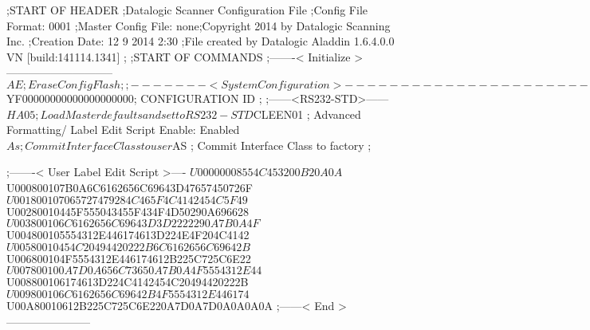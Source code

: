 ;START OF HEADER
;Datalogic Scanner Configuration File
;Config File Format: 0001
;Master Config File: none;Copyright 2014 by Datalogic Scanning Inc.
;Creation Date: 12 9 2014 2:30
;File created by Datalogic Aladdin 1.6.4.0.0 VN [build:141114.1341]
;
;START OF COMMANDS
;-------< Initialize >-----------------------------
$AE                 ; Erase Config Flash
;
;-------< System Configuration >-------------------------------
$YF00000000000000000000; CONFIGURATION ID
;
;------<RS232-STD>------
$HA05              ; Load Master defaults and set to RS232-STD
$CLEEN01            ; Advanced Formatting/ Label Edit Script Enable: Enabled
$As                 ; Commit Interface Class to user
$AS                 ; Commit Interface Class to factory
;

;-------< User Label Edit Script >----
$U00000008554C453200B20A0A
$U000800107B0A6C6162656C69643D47657450726F
$U001800107065727479284C465F4C4142454C5F49
$U00280010445F555043455F434F4D50290A696628
$U003800106C6162656C69643D3D2222290A7B0A4F
$U004800105554312E446174613D224E4F204C4142
$U00580010454C20494420222B6C6162656C69642B
$U006800104F5554312E446174612B225C725C6E22
$U007800100A7D0A656C73650A7B0A4F5554312E44
$U008800106174613D224C4142454C20494420222B
$U009800106C6162656C69642B4F5554312E446174
$U00A80010612B225C725C6E220A7D0A7D0A0A0A0A
;------< End >-----------------------
